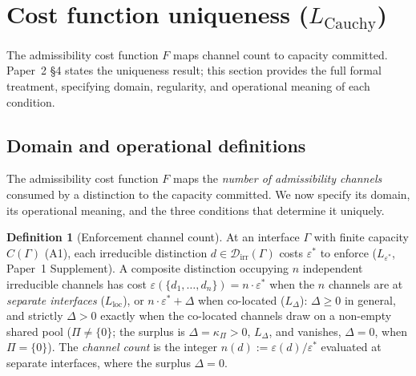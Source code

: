 \documentclass[11pt]{article}
\theoremstyle{definition}
\newtheorem{definition}[theorem]{Definition}
\begin{document}
\section{Cost function uniqueness ($L_{\mathrm{Cauchy}}$)}
\label{sec:cauchy_supp}

The admissibility cost function $F$ maps channel count to capacity committed.
Paper~2 \S4 states the uniqueness result; this section provides the full
formal treatment, specifying domain, regularity, and operational meaning
of each condition.

%
%


\subsection{Domain and operational definitions}
\label{sec:cauchy_domain}

The admissibility cost function $F$ maps the \emph{number of admissibility
channels} consumed by a distinction to the capacity committed.  We now
specify its domain, its operational meaning, and the three conditions
that determine it uniquely.

\begin{definition}[Enforcement channel count]\label{def:channel_count}
At an interface $\Gamma$ with finite capacity $C(\Gamma)$ (A1), each
irreducible distinction $d \in \mathcal{D}_{\mathrm{irr}}(\Gamma)$ costs
$\varepsilon^*$ to enforce ($L_{\varepsilon^*}$, Paper~1 Supplement).
A composite distinction occupying $n$ independent irreducible channels
has cost $\varepsilon(\{d_1, \ldots, d_n\}) = n \cdot \varepsilon^*$
when the $n$ channels are at \emph{separate interfaces} ($L_{\mathrm{loc}}$),
or $n \cdot \varepsilon^* + \Delta$ when co-located ($L_\Delta$):
$\Delta \ge 0$ in general, and strictly $\Delta > 0$ exactly when the
co-located channels draw on a non-empty shared pool ($\Pi \neq \{0\}$;
the surplus is $\Delta = \kappa_\Pi > 0$, $L_\Delta$, and vanishes,
$\Delta = 0$, when $\Pi = \{0\}$).  The \emph{channel count} is the integer
$n(d) := \varepsilon(d) / \varepsilon^*$ evaluated at separate interfaces,
where the surplus $\Delta = 0$.
\end{definition}
\end{document}
